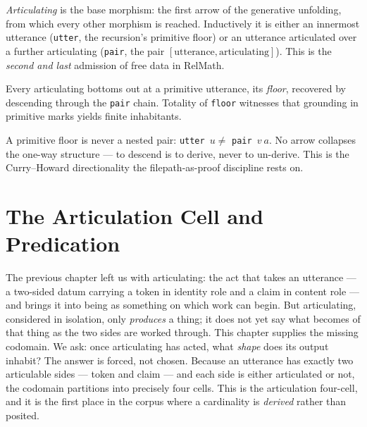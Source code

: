 \begin{definition}[Articulating]
  \label{def:articulating}
  \leanok
  \emph{Articulating} is the base morphism: the first arrow of the generative
  unfolding, from which every other morphism is reached. Inductively it is either an
  innermost utterance (\texttt{utter}, the recursion's primitive floor) or an
  utterance articulated over a further articulating (\texttt{pair}, the pair
  $[\text{utterance}, \text{articulating}]$). This is the \emph{second and last}
  admission of free data in RelMath.
\end{definition}

\begin{definition}[Floor]
  \label{def:floor}
  \leanok
  Every articulating bottoms out at a primitive utterance, its \emph{floor},
  recovered by descending through the \texttt{pair} chain. Totality of \texttt{floor}
  witnesses that grounding in primitive marks yields finite inhabitants.
\end{definition}

\begin{lemma}
  \label{lem:articulating-oneway}
  \leanok
  A primitive floor is never a nested pair: \texttt{utter}~$u \neq$ \texttt{pair}~$v\
  a$. No arrow collapses the one-way structure --- to descend is to derive, never to
  un-derive. This is the Curry--Howard directionality the filepath-as-proof
  discipline rests on.
\end{lemma}

\chapter{The Articulation Cell and Predication}\label{ch:predicating}

The previous chapter left us with articulating: the act that takes an utterance --- a two-sided datum carrying a token in identity role and a claim in content role --- and brings it into being as something on which work can begin. But articulating, considered in isolation, only \emph{produces} a thing; it does not yet say what becomes of that thing as the two sides are worked through. This chapter supplies the missing codomain. We ask: once articulating has acted, what \emph{shape} does its output inhabit? The answer is forced, not chosen. Because an utterance has exactly two articulable sides --- token and claim --- and each side is either articulated or not, the codomain partitions into precisely four cells. This is the articulation four-cell, and it is the first place in the corpus where a cardinality is \emph{derived} rather than posited.

